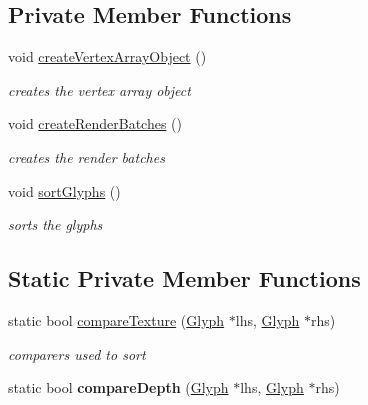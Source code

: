 \subsection*{Private Member Functions}
\begin{DoxyCompactItemize}
\item 
\mbox{\label{classnta_1_1SpriteBatch_a3355b0c2840d3d78c092508925bf9565}} 
void \hyperlink{classnta_1_1SpriteBatch_a3355b0c2840d3d78c092508925bf9565}{create\+Vertex\+Array\+Object} ()
\begin{DoxyCompactList}\small\item\em creates the vertex array object \end{DoxyCompactList}\item 
\mbox{\label{classnta_1_1SpriteBatch_af22e3c4af01fef017e9522021545928f}} 
void \hyperlink{classnta_1_1SpriteBatch_af22e3c4af01fef017e9522021545928f}{create\+Render\+Batches} ()
\begin{DoxyCompactList}\small\item\em creates the render batches \end{DoxyCompactList}\item 
\mbox{\label{classnta_1_1SpriteBatch_ae8cf94595c26211521df9e1580776289}} 
void \hyperlink{classnta_1_1SpriteBatch_ae8cf94595c26211521df9e1580776289}{sort\+Glyphs} ()
\begin{DoxyCompactList}\small\item\em sorts the glyphs \end{DoxyCompactList}\end{DoxyCompactItemize}
\subsection*{Static Private Member Functions}
\begin{DoxyCompactItemize}
\item 
\mbox{\label{classnta_1_1SpriteBatch_acd5b622817c1bab5c60de488b089f0f9}} 
static bool \hyperlink{classnta_1_1SpriteBatch_acd5b622817c1bab5c60de488b089f0f9}{compare\+Texture} (\hyperlink{structnta_1_1Glyph}{Glyph} $\ast$lhs, \hyperlink{structnta_1_1Glyph}{Glyph} $\ast$rhs)
\begin{DoxyCompactList}\small\item\em comparers used to sort \end{DoxyCompactList}\item 
\mbox{\label{classnta_1_1SpriteBatch_ae7aea3ca736e40b3a861048e883eabdc}} 
static bool {\bfseries compare\+Depth} (\hyperlink{structnta_1_1Glyph}{Glyph} $\ast$lhs, \hyperlink{structnta_1_1Glyph}{Glyph} $\ast$rhs)
\end{DoxyCompactItemize}
